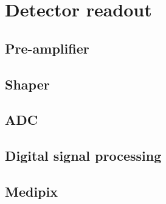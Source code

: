 \documentclass[../main/thesis.tex]{subfiles}
\begin{document}
\section{Detector readout}
\label{t-read}

\subsection{Pre-amplifier}
\label{t-amp}

\subsection{Shaper}
\label{t-shaper}

\subsection{ADC}
\label{t-adc}

\subsection{Digital signal processing}
\label{t-dsp}

\subsection{Medipix}
\label{t-medipix}
\end{document}
